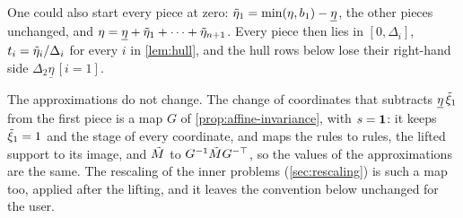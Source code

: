 \begin{remark}
\label{rem:shifted-lifting}
One could also start every piece at zero:
$\tilde\eta_1 = \min(\eta, b_1) - \underline\eta$, the other pieces unchanged, and $\eta = \underline\eta + \tilde\eta_1 + \dots + \tilde\eta_{n+1}$.
Every piece then lies in $[0, \Delta_i]$, $t_i = \tilde\eta_i/\Delta_i$ for every $i$ in \cref{lem:hull},
and the hull rows below lose their right-hand side $\Delta_2\underline\eta\,[i = 1]$.

The approximations do not change.
The change of coordinates that subtracts $\underline\eta\,\tilde\xi_1$ from the first piece is a map $G$ of \cref{prop:affine-invariance}, with $s = \mathbf{1}$:
it keeps $\tilde\xi_1 = 1$ and the stage of every coordinate, and maps the rules to rules, the lifted support to its image, and $\tilde M$ to $G^{-1}\tilde M G^{-\top}$,
so the values of the approximations are the same.
The rescaling of the inner problems (\cref{sec:rescaling}) is such a map too, applied after the lifting, and it leaves the convention below unchanged for the user.


\end{remark}
